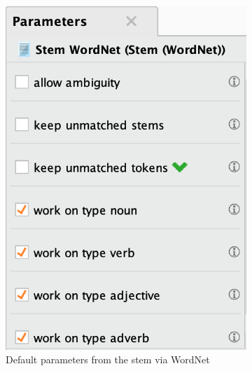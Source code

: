 \documentclass[a4paper]{article}
\begin{document}
\begin{figure}[H]
    \centering
    \begin{subfigure}[b]{0.3\textwidth}
        \includegraphics[width=\textwidth]{imgs/part_3/3_processing_documents_stem_wordnet_params_default}
        \caption{Default parameters from the stem via WordNet}
        \label{fig:3_processing_documents_stem_wordnet_params_default}
    \end{subfigure}
    \hspace{0.1\textwidth}
    \begin{subfigure}[b]{0.3\textwidth}

\end{subfigure}
\end{figure}
\end{document}
